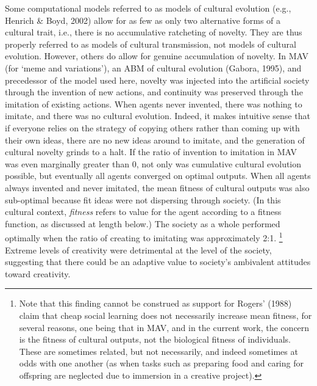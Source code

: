 \documentclass[a4paper,12pt,man,british]{apa6}
\begin{document}
Some computational models referred to as models of cultural evolution (e.g., Henrich \& Boyd, 2002) allow for as few as only two alternative forms of a cultural trait, i.e., there is no accumulative ratcheting of novelty. They are thus properly referred to as models of cultural transmission, not models of cultural evolution. 
However, others do allow for genuine accumulation of novelty. In MAV (for `meme and variations'), an ABM of cultural evolution (Gabora, 1995), and precedessor of the model used here, novelty was injected into the artificial society through the invention of new actions, and continuity was preserved through the imitation of existing actions. When agents never invented, there was nothing to imitate, and there was no cultural evolution. 
Indeed, it makes intuitive sense that if everyone relies on the strategy of copying others rather than coming up with their own ideas, there are no new ideas around to imitate, and the generation of cultural novelty grinds to a halt. 
If the ratio of invention to imitation in MAV was even marginally greater than 0, not only was cumulative cultural evolution possible, but eventually all agents converged on optimal outputs. When all agents always invented and never imitated, the mean fitness of cultural outputs was also sub-optimal because fit ideas were not dispersing through society. (In this cultural context, \emph{fitness} refers to value for the agent according to a fitness function, as discussed at length below.) The society as a whole performed optimally when the ratio of creating to imitating was approximately 2:1. \footnote{Note that this finding cannot be construed as support for Rogers' (1988) claim that cheap social learning does not necessarily increase mean fitness, for several reasons, one being that in MAV, and in the current work, the concern is the fitness of cultural outputs, not the biological fitness of individuals. These are sometimes related, but not necessarily, and indeed sometimes at odds with one another (as when tasks such as preparing food and caring for offspring are neglected due to immersion in a creative project).}
Extreme levels of creativity were detrimental at the level of the society, suggesting that there could be an adaptive value to society's ambivalent attitudes toward creativity.
\end{document}
